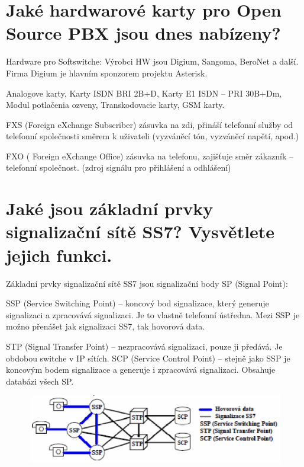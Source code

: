\section{Jaké hardwarové karty pro Open Source PBX jsou dnes nabízeny?}

Hardware pro Softswitche: Výrobci HW jsou Digium, Sangoma, BeroNet a další. Firma Digium je hlavním sponzorem projektu Asterisk.

Analogove karty, Karty ISDN BRI 2B+D, Karty E1 ISDN -- PRI 30B+Dm, Modul potlačenia ozveny, Transkodovacie karty, GSM karty.

FXS (Foreign eXchange Subscriber) zásuvka na zdi, přináší telefonní služby od telefonní společnosti směrem k uživateli (vyzváněcí tón, vyzváněcí napětí, apod.)

FXO ( Foreign eXchange Office) zásuvka na telefonu, zajišťuje směr zákazník -- telefonní společnost. (zdroj signálu pro přihlášení a odhlášení)

\section{Jaké jsou základní prvky signalizační sítě SS7? Vysvětlete jejich funkci.}

Základní prvky signalizační sítě SS7 jsou signalizační body SP (Signal Point):

SSP (Service Switching Point) -- koncový bod signalizace, který generuje signalizaci a zpracovává signalizaci. Je to vlastně telefonní ústředna. Mezi SSP je možno přenášet jak signalizaci SS7, tak hovorová data.

STP (Signal Transfer Point) -- nezpracovává signalizaci, pouze ji předává. Je obdobou switche v IP sítích. SCP (Service Control Point) -- stejně jako SSP je koncovým bodem signalizace a generuje i zpracovává signalizaci. Obsahuje databázi všech SP.

\begin{figure}[h!]
    \begin{center}
        \includegraphics[width=\textwidth]{images/otazka18.png}
        \label{img:8}
    \end{center}
\end{figure}

